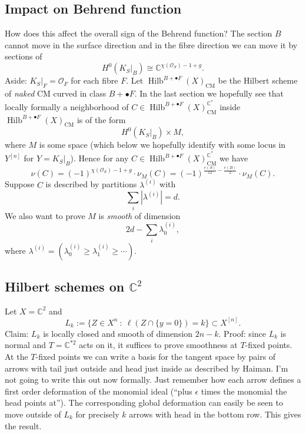 \documentclass{amsart}
\theoremstyle{definition}
\newcommand{\CC} {\mathbb{C}}          %
\renewcommand{\O}{\mathcal{O}}
\newcommand{\Hilb}{\operatorname{Hilb}}
\newcommand{\CM}{\operatorname{CM}}
\begin{document}
\subsection{Impact on Behrend function} How does this affect the overall sign of the Behrend function? The section $B$ cannot move in the surface direction and in the fibre direction we can move it by sections of 
\[
H^0(K_S|_B) \cong \CC^{\chi(\O_S) - 1+g}.
\]     
Aside: $K_{S}|_{F} = \O_F$ for each fibre $F$. Let $\Hilb^{B+\bullet F}(X)_{\CM}$ be the Hilbert scheme of \emph{naked} CM curved in class $B+\bullet F$. In the last section we hopefully see that locally formally a neighborhood of $C \in \Hilb^{B+\bullet F}(X)^{\CC^*}_{\CM}$ inside $\Hilb^{B+\bullet F}(X)_{\CM}$ is of the form
\[
H^0(K_S|_B) \times M,
\]
where $M$ is some space (which below we hopefully identify with some locus in $Y^{[n]}$ for $Y = K_{S}|_{B}$). Hence for any $C \in \Hilb^{B+\bullet F}(X)^{\CC^*}_{\CM}$ we have
$$
\nu(C) = (-1)^{\chi(\O_S) - 1+g} \cdot \nu_{M}(C) = (-1)^{\frac{e(S)}{12} - \frac{e(B)}{2}} \cdot \nu_{M}(C).
$$
Suppose $C$ is described by partitions $\lambda^{(i)}$ with
\[
\sum_i |\lambda^{(i)}| = d.
\]
We also want to prove $M$ is \emph{smooth} of dimension
$$
2d - \sum_i \lambda_{0}^{(i)},
$$
where $\lambda^{(i)} = (\lambda^{(i)}_{0} \geq \lambda^{(i)}_{1} \geq \cdots)$.


\subsection{Hilbert schemes on $\CC^2$}

Let $X = \CC^2$ and
\[
L_k := \{ Z \in X^{n} \ : \ \ell(Z \cap \{y=0\}) = k \} \subset X^{[n]}.
\]
 Claim: $L_k$ is locally closed and smooth of dimension $2n-k$. Proof: since $L_k$ is normal  and $T = \CC^{*2}$ acts on it, it suffices to prove smoothness at $T$-fixed points. At the $T$-fixed points we can write a basis for the tangent space by pairs of arrows with tail just outside and head just inside as described by Haiman. I'm not going to write this out now formally. Just remember how each arrow defines a first order deformation of the monomial ideal (``plus $\epsilon$ times the monomial the head points at''). The corresponding global deformation can easily be seen to move outside of $L_k$ for precisely $k$ arrows with head in the bottom row. This gives the result.   
\end{document}
